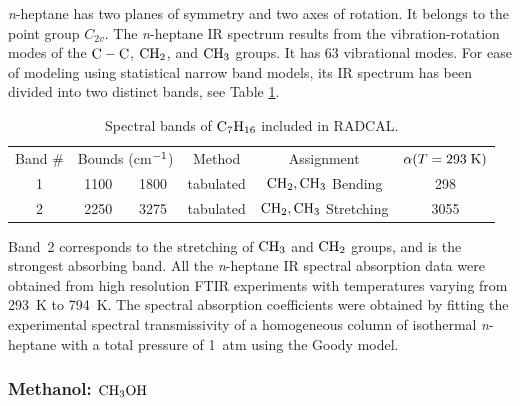 \textit{n}-heptane has two planes of symmetry and two axes of rotation. It belongs to the point group $C_{2v}$. The \textit{n}-heptane IR spectrum results from the vibration-rotation modes of the $\rm C-C$, $\rm CH_2$, and $\rm CH_3$ groups. It has 63 vibrational modes. For ease of modeling using statistical narrow band models, its IR spectrum has been divided into two distinct bands, see Table \ref{Table::C7H16}.
\begin{table}[ht]
   \centering
   \caption{Spectral bands of $\rm C_7H_{16}$ included in RADCAL.}
   \vspace{0.1in}
   \label{Table::C7H16}
   \begin{tabular}{|c|c|c|c|c|c|}
    \hline
    Band \# & \multicolumn{2}{|l|}{Bounds (cm$\rm ^{-1}$) } & Method & Assignment & $\alpha(T=293 \; {\rm K})$\\
    \cline{1-6}
    1 & 1100  & 1800 & tabulated &  $\rm CH_2, CH_3$ Bending    & 298 \\
    2 & 2250  & 3275 & tabulated &  $\rm CH_2, CH_3$ Stretching & 3055 \\
    \hline
   \end{tabular}
\end{table}
Band~2 corresponds to the stretching of $\rm CH_3$ and $\rm CH_2$ groups, and is the strongest absorbing band. All the \textit{n}-heptane IR spectral absorption data were obtained from high resolution FTIR experiments with temperatures varying from 293~K to 794~K. The spectral absorption coefficients were obtained by fitting the experimental spectral transmissivity of a homogeneous column of isothermal \textit{n}-heptane with a total pressure of 1~atm using the Goody model.

\subsubsection{Methanol: $\rm CH_3OH$}

